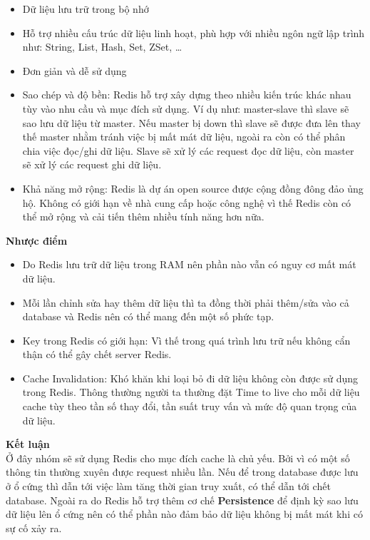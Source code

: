             \begin{itemize}
                \item Dữ liệu lưu trữ trong bộ nhớ
                \item Hỗ trợ nhiều cấu trúc dữ liệu linh hoạt, phù hợp với nhiều ngôn ngữ lập trình như: String, List, Hash, Set, ZSet, …
                \item Đơn giản và dễ sử dụng
                \item Sao chép và độ bền: Redis hỗ trợ xây dựng theo nhiều kiến trúc khác nhau tùy vào nhu cầu và mục đích sử dụng. Ví dụ như: master-slave thì slave sẽ sao lưu dữ liệu từ master. Nếu master bị down thì slave sẽ được đưa lên thay thế master nhằm tránh việc bị mất mát dữ liệu, ngoài ra còn có thể phân chia việc đọc/ghi dữ liệu. Slave sẽ xử lý các request đọc dữ liệu, còn master sẽ xử lý các request ghi dữ liệu.
                \item Khả năng mở rộng: Redis là dự án open source được cộng đồng đông đảo ủng hộ. Không có giới hạn về nhà cung cấp hoặc công nghệ vì thế Redis còn có thể mở rộng và cải tiến thêm nhiều tính năng hơn nữa.
            \end{itemize}
            
            \textbf{Nhược điểm}
            
            \begin{itemize}
                \item Do Redis lưu trữ dữ liệu trong RAM nên phần nào vẫn có nguy cơ mất mát dữ liệu.
                \item Mỗi lần chỉnh sửa hay thêm dữ liệu thì ta đồng thời phải thêm/sửa vào cả database và Redis nên có thể mang đến một số phức tạp.
                \item Key trong Redis có giới hạn: Vì thế trong quá trình lưu trữ nếu không cẩn thận có thể gây chết server Redis.
                \item Cache Invalidation: Khó khăn khi loại bỏ đi dữ liệu không còn được sử dụng trong Redis. Thông thường người ta thường đặt Time to live cho mỗi dữ liệu cache tùy theo tần số thay đổi, tần suất truy vấn và mức độ quan trọng của dữ liệu.
            \end{itemize}
            
            \textbf{Kết luận}\\
            
            Ở đây nhóm sẽ sử dụng Redis cho mục đích cache là chủ yếu. Bởi vì có một số thông tin thường xuyên được request nhiều lần. Nếu để trong database được lưu ở ổ cứng thì dẫn tới việc làm tăng thời gian truy xuất, có thể dẫn tới chết database. Ngoài ra do Redis hỗ trợ thêm cơ chế \textbf{Persistence} để định kỳ sao lưu dữ liệu lên ổ cứng nên có thể phần nào đảm bảo dữ liệu không bị mất mát khi có sự cố xảy ra.
            
